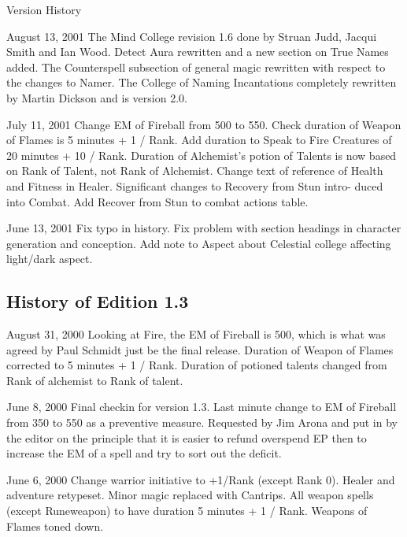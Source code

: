 \begin{Chapter}{Version History}
\begin{Description}
\item[August 13, 2001] The Mind College revision 1.6 done by Struan
  Judd, Jacqui Smith and Ian Wood.  Detect Aura rewritten and a new
  section on True Names added.  The Counterspell subsection of general
  magic rewritten with respect to the changes to Namer.  The College
  of Naming Incantations completely rewritten by Martin Dickson and is
  version 2.0.

\item[July 11, 2001] Change EM of Fireball from 500 to 550.  Check
  duration of Weapon of Flames is 5 minutes + 1 / Rank. Add duration
  to Speak to Fire Creatures of 20 minutes + 10 / Rank.  Duration of
  Alchemist’s potion of Talents is now based on Rank of Talent, not
  Rank of Alchemist.  Change text of reference of Health and Fitness
  in Healer.  Significant changes to Recovery from Stun intro- duced
  into Combat.  Add Recover from Stun to combat actions table.

\item[June 13, 2001] Fix typo in history.  Fix problem with section
  headings in character generation and conception.  Add note to Aspect
  about Celestial college affecting light/dark aspect.

\end{Description}

\subsection{History of Edition 1.3}

\begin{Description}

\item[August 31, 2000] Looking at Fire, the EM of Fireball is 500,
  which is what was agreed by Paul Schmidt just be the final release.
  Duration of Weapon of Flames corrected to 5 minutes + 1 / Rank.
  Duration of potioned talents changed from Rank of alchemist to Rank
  of talent.

\item[June 8, 2000] Final checkin for version 1.3.  Last minute change
  to EM of Fireball from 350 to 550 as a preventive measure.
  Requested by Jim Arona and put in by the editor on the principle
  that it is easier to refund overspend EP then to increase the EM of
  a spell and try to sort out the deficit.

\item[June 6, 2000] Change warrior initiative to +1/Rank (except Rank
  0).  Healer and adventure retypeset.  Minor magic replaced with
  Cantrips.  All weapon spells (except Runeweapon) to have duration 5
  minutes + 1 / Rank.  Weapons of Flames toned down.


\end{Description}
\end{Chapter}
